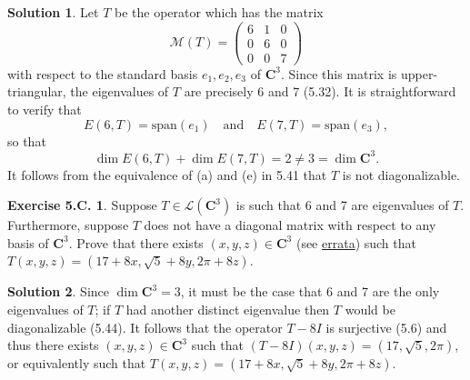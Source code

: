 \documentclass[12pt]{article}
\theoremstyle{definition}
\theoremstyle{exercise}
\newtheorem{exercise}{Exercise 5.C.}
\theoremstyle{solution}
\newtheorem*{solution}{Solution}
\newcommand{\lmap}{\mathcal{L}}
\newcommand{\mat}{\mathcal{M}}
\newcommand{\Span}{\text{span}}
\newcommand{\quand}{\quad \text{and} \quad}
\newcommand{\C}{\mathbf{C}}
\begin{document}
\begin{solution}
    Let \( T \) be the operator which has the matrix
    \[
        \mat(T) = \begin{pmatrix}
            6 & 1 & 0 \\
            0 & 6 & 0 \\
            0 & 0 & 7
        \end{pmatrix}
    \]
    with respect to the standard basis \( e_1, e_2, e_3 \) of \( \C^3 \). Since this matrix is upper-triangular, the eigenvalues of \( T \) are precisely 6 and 7 (5.32). It is straightforward to verify that
    \[
        E(6, T) = \Span(e_1) \quand E(7, T) = \Span(e_3),
    \]
    so that
    \[
        \dim E(6, T) + \dim E(7, T) = 2 \neq 3 = \dim \C^3.
    \]
    It follows from the equivalence of (a) and (e) in 5.41 that \( T \) is not diagonalizable.
\end{solution}

\begin{exercise}
\label{ex:15}
    Suppose \( T \in \lmap(\C^3) \) is such that 6 and 7 are eigenvalues of \( T \). Furthermore, suppose \( T \) does not have a diagonal matrix with respect to any basis of \( \C^3 \). Prove that there exists \( (x, y, z) \in \C^3 \) (see \href{https://linear.axler.net/LADRErrataThird.html}{errata}) such that \( T(x, y, z) = (17 + 8x, \sqrt{5} + 8y, 2 \pi + 8z) \).
\end{exercise}

\begin{solution}
    Since \( \dim \C^3 = 3 \), it must be the case that 6 and 7 are the only eigenvalues of \( T \); if \( T \) had another distinct eigenvalue then \( T \) would be diagonalizable (5.44). It follows that the operator \( T - 8I \) is surjective (5.6) and thus there exists \( (x, y, z) \in \C^3 \) such that \( (T - 8I)(x, y, z) = (17, \sqrt{5}, 2 \pi) \), or equivalently such that \( T(x, y, z) = (17 + 8x, \sqrt{5} + 8y, 2 \pi + 8z) \).
\end{solution}
\end{document}
